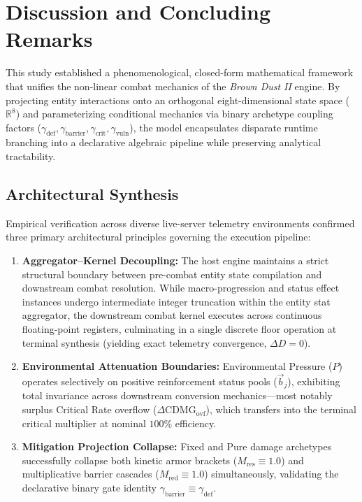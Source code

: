\documentclass[twocolumn,10pt]{article}
\begin{document}
\clearpage
\section{Discussion and Concluding Remarks}
\label{sec:conclusion}

This study established a phenomenological, closed-form mathematical framework that unifies the non-linear combat mechanics of the \textit{Brown Dust II} engine. By projecting entity interactions onto an orthogonal eight-dimensional state space ($\mathbb{R}^8$) and parameterizing conditional mechanics via binary archetype coupling factors ($\gamma_{\text{def}}, \gamma_{\text{barrier}}, \gamma_{\text{crit}}, \gamma_{\text{vuln}}$), the model encapsulates disparate runtime branching into a declarative algebraic pipeline while preserving analytical tractability.

\subsection{Architectural Synthesis}
Empirical verification across diverse live-server telemetry environments confirmed three primary architectural principles governing the execution pipeline:
\begin{enumerate}
    \item \textbf{Aggregator--Kernel Decoupling:} The host engine maintains a strict structural boundary between pre-combat entity state compilation and downstream combat resolution. While macro-progression and status effect instances undergo intermediate integer truncation within the entity stat aggregator, the downstream combat kernel executes across continuous floating-point registers, culminating in a single discrete floor operation at terminal synthesis (yielding exact telemetry convergence, $\Delta D = 0$).
    \item \textbf{Environmental Attenuation Boundaries:} Environmental Pressure ($P$) operates selectively on positive reinforcement status pools ($\vec{b}_j$), exhibiting total invariance across downstream conversion mechanics—most notably surplus Critical Rate overflow ($\Delta \text{CDMG}_{\text{ovf}}$), which transfers into the terminal critical multiplier at nominal $100\%$ efficiency.
    \item \textbf{Mitigation Projection Collapse:} Fixed and Pure damage archetypes successfully collapse both kinetic armor brackets ($M_{\text{res}} \equiv 1.0$) and multiplicative barrier cascades ($M_{\text{red}} \equiv 1.0$) simultaneously, validating the declarative binary gate identity $\gamma_{\text{barrier}} \equiv \gamma_{\text{def}}$.
\end{enumerate}
\end{document}
